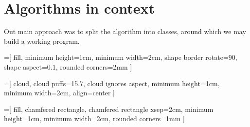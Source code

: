 \section{Algorithms in context}
Out main approach was to split the algorithm into classes, around
which we may build a working program.

\def \mheight {1cm}
\def \mwidth {2cm}

=[
  fill, 
  minimum height=\mheight, 
  minimum width=\mwidth, 
  shape border rotate=90, 
  shape aspect=0.1,
  rounded corners=2mm
]

=[
  cloud, 
  cloud puffs=15.7, 
  cloud ignores aspect, 
  minimum height=\mheight,
  minimum width=\mwidth, 
  align=center
]

=[
  fill,
  chamfered rectangle,
  chamfered rectangle xsep=2cm,
  minimum height=\mheight, 
  minimum width=\mwidth,
  rounded corners=1mm
]


